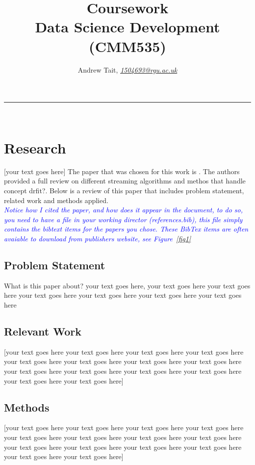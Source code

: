 \documentclass[10pt]{article}\usepackage[]{graphicx}\usepackage[]{color}
\begin{document}
\title{\LARGE Coursework  \\ Data Science Development (CMM535)}

\author{Andrew Tait, \textit{\href{1504693@rgu.ac.uk}{1504693@rgu.ac.uk}}}
\maketitle
\noindent\rule{16cm}{0.4pt}
\ \\

\section{Research}

[your text goes here]
The paper that was chosen for this work is \cite{6779381}. The authors provided a full review on different streaming algorithms and methos that handle concept drfit?. Below is a review of this paper that includes problem statement, related work and methods applied.\\

\textcolor{blue}{\textit{Notice how I cited the paper, and how does it appear in the document, to do so, you need to have a file in your working director (references.bib), this file simply contains the bibtext items for the papers you chose. These BibTex items are often avaiable to download from publishers website, see Figure~\ref{fig1}}}
\subsection{Problem Statement}
What is this paper about? your text goes here, your text goes here your text goes here your text goes here your text goes here your text goes here your text goes here

\subsection{Relevant Work}
[your text goes here your text goes here your text goes here your text goes here your text goes here your text goes here your text goes here your text goes here your text goes here your text goes here your text goes here your text goes here your text goes here your text goes here]
\subsection{Methods}
[your text goes here your text goes here your text goes here your text goes here your text goes here your text goes here your text goes here your text goes here your text goes here your text goes here your text goes here your text goes here your text goes here your text goes here]
\end{document}
